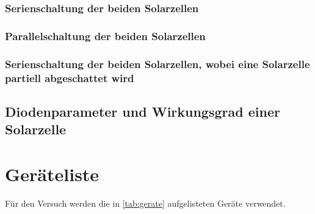 \documentclass[12pt,english,ngerman]{scrartcl}
\begin{document}
\subsubsection{Serienschaltung der beiden Solarzellen}

\subsubsection{Parallelschaltung der beiden Solarzellen}


\subsubsection{Serienschaltung der beiden Solarzellen, wobei eine Solarzelle partiell abgeschattet wird}

\subsection{Diodenparameter und Wirkungsgrad einer Solarzelle}



\section{Geräteliste}\label{sec:geraeteliste}

Für den Versuch werden die in \autoref{tab:gerate} aufgelisteten Geräte
verwendet.

\end{document}
